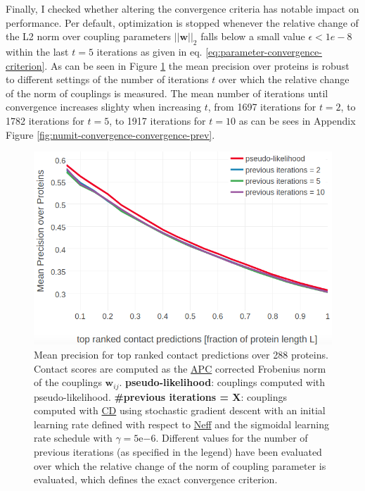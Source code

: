 \documentclass[11pt,a4paper,twoside]{book}
\newcommand{\eq}{\!=\!}
\newcommand{\w}{\mathbf{w}}
\newcommand{\wij}{\mathbf{w}_{ij}}
\theoremstyle{definition}
\theoremstyle{definition}
\theoremstyle{remark}
\begin{document}
Finally, I checked whether altering the convergence criteria has notable
impact on performance. Per default, optimization is stopped whenever the
relative change of the L2 norm over coupling parameters \(||\w||_2\)
falls below a small value \(\epsilon < 1e-8\) within the last \(t\eq5\)
iterations as given in eq. \eqref{eq:parameter-convergence-criterion}. As
can be seen in Figure \ref{fig:performance-cd-convergence-prev} the mean
precision over proteins is robust to different settings of the number of
iterations \(t\) over which the relative change of the norm of couplings
is measured. The mean number of iterations until convergence increases
slighty when increasing \(t\), from 1697 iterations for \(t\eq2\), to
1782 iterations for \(t\eq5\), to 1917 iterations for \(t\eq10\) as can
be sees in Appendix Figure \ref{fig:numit-convergence-convergence-prev}.














\begin{figure}

{\centering \includegraphics[width=1\linewidth]{img/full_likelihood/sgd/precision_vs_rank_convergence_prev} 

}

\caption{Mean precision for top
ranked contact predictions over 288 proteins. Contact scores are
computed as the \protect\hyperlink{abbrev}{APC} corrected Frobenius norm
of the couplings \(\wij\). \textbf{pseudo-likelihood}: couplings
computed with pseudo-likelihood. \textbf{\#previous iterations = X}:
couplings computed with \protect\hyperlink{abbrev}{CD} using stochastic
gradient descent with an initial learning rate defined with respect to
\protect\hyperlink{abbrev}{Neff} and the sigmoidal learning rate
schedule with \(\gamma \eq 5\mathrm{e}{-6}\). Different values for the
number of previous iterations (as specified in the legend) have been
evaluated over which the relative change of the norm of coupling
parameter is evaluated, which defines the exact convergence criterion.}\label{fig:performance-cd-convergence-prev}
\end{figure}
\end{document}
